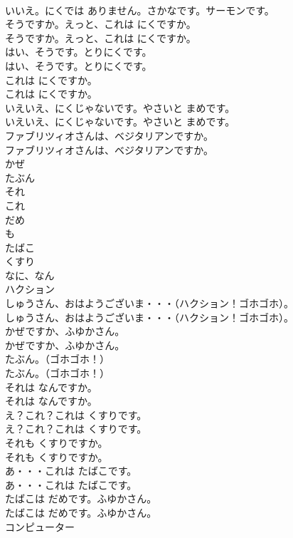 \documentclass[8pt]{extreport}
\begin{document}
\begin{CJK}{UTF8}{min}
\\	いいえ。にくでは ありません。さかなです。サーモンです。 
\\	そうですか。えっと、これは にくですか。	
\\	そうですか。えっと、これは にくですか。 
\\	はい、そうです。とりにくです。	
\\	はい、そうです。とりにくです。 
\\	これは にくですか。	
\\	これは にくですか。 
\\	いえいえ、にくじゃないです。やさいと まめです。	
\\	いえいえ、にくじゃないです。やさいと まめです。 
\\	ファブリツィオさんは、ベジタリアンですか。	
\\	ファブリツィオさんは、ベジタリアンですか。 
\\	かぜ
\\	たぶん
\\	それ
\\	これ
\\	だめ
\\	も
\\	たばこ
\\	くすり
\\	なに、なん
\\	ハクション
\\	しゅうさん、おはようございま・・・（ハクション！ゴホゴホ）。	
\\	しゅうさん、おはようございま・・・（ハクション！ゴホゴホ）。 
\\	かぜですか、ふゆかさん。	
\\	かぜですか、ふゆかさん。 
\\	たぶん。（ゴホゴホ！）	
\\	たぶん。（ゴホゴホ！） 
\\	それは なんですか。	
\\	それは なんですか。 
\\	え？これ？これは くすりです。	
\\	え？これ？これは くすりです。 
\\	それも くすりですか。	
\\	それも くすりですか。 
\\	あ・・・これは たばこです。	
\\	あ・・・これは たばこです。 
\\	たばこは だめです。ふゆかさん。	
\\	たばこは だめです。ふゆかさん。 
\\	コンピューター

\end{CJK}
\end{document}

